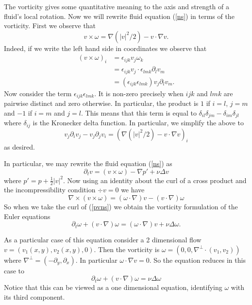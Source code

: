 The vorticity gives some quantitative meaning to the axis and strength of a fluid's local rotation. Now we will rewrite fluid equation (\ref{ns}) in terms of the vorticity. First we observe that 
\[v \times \omega = \nabla(|v|^2/2) - v \cdot \nabla v.\]
Indeed, if we write the left hand side in coordinates we observe that 
\begin{align}
    (v \times \omega)_i &= \epsilon_{ijk}v_j\omega_k \\
    &= \epsilon_{ijk}v_j \cdot \epsilon_{lmk}\partial_lv_m \\
    &= (\epsilon_{ijk}\epsilon_{lmk})v_j\partial_lv_m.
\end{align}
Now consider the term $\epsilon_{ijk}\epsilon_{lmk}$. It is non-zero precisely when $ijk$ and $lmk$ are pairwise distinct and zero otherwise. In particular, the product is $1$ if $i = l$, $j = m$ and $-1$ if $i = m$ and $j = l$. This means that this term is equal to $\delta_{il}\delta_{jm} - \delta_{im}\delta_{jl}$ where $\delta_{ij}$ is the Kronecker delta function. In particular, we simplify the above to
\[v_j\partial_iv_j - v_j\partial_jv_i = (\nabla(|v|^2/2) - v\cdot \nabla v)_i\]
as desired.

In particular, we may rewrite the fluid equation (\ref{ns}) as
\begin{equation}
    \partial_t v = (v \times \omega) - \nabla p' + \nu\Delta v \label{pvns}
\end{equation}
where $p' = p + \frac{1}{2}|v|^2$. Now using an identity about the curl of a cross product and the incompressibility condition $\div v = 0$ we have
\[\nabla \times (v \times \omega) = (\omega \cdot \nabla)v - (v \cdot \nabla)\omega\]
So when we take the curl of (\ref{pvns}) we obtain the vorticity formulation of the Euler equations
\begin{equation}
    \partial_t \omega + (v \cdot \nabla)\omega = (\omega \cdot \nabla)v + \nu \Delta \omega. \label{vns}
\end{equation}

As a particular case of this equation consider a 2 dimensional flow $v = (v_1(x, y), v_2(x, y), 0)$. Then the vorticity is $\omega = (0, 0, \nabla^\perp\cdot(v_1, v_2))$ where $\nabla^\perp = (-\partial_y, \partial_x)$. In particular $\omega \cdot \nabla v = 0$. So the equation reduces in this case to
\begin{equation}
    \partial_t\omega + (v \cdot \nabla)\omega = \nu \Delta \omega \label{2dvns}
\end{equation}
Notice that this can be viewed as a one dimensional equation, identifying $\omega$ with its third component.

